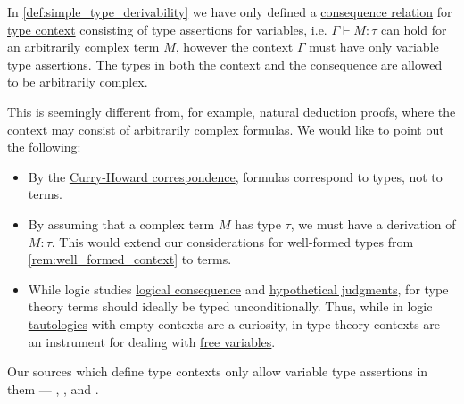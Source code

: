 \begin{remark}\label{rem:type_context_only_variables}
  In \cref{def:simple_type_derivability} we have only defined a \hyperref[def:consequence_relation]{consequence relation} for \hyperref[def:type_context]{type context} consisting of type assertions for variables, i.e. \( \Gamma \vdash M: \tau \) can hold for an arbitrarily complex term \( M \), however the context \( \Gamma \) must have only variable type assertions. The types in both the context and the consequence are allowed to be arbitrarily complex.

  This is seemingly different from, for example, natural deduction proofs, where the context may consist of arbitrarily complex formulas. We would like to point out the following:
  \begin{itemize}
    \item By the \hyperref[con:curry_howard_correspondence]{Curry-Howard correspondence}, formulas correspond to types, not to terms.

    \item By assuming that a complex term \( M \) has type \( \tau \), we must have a derivation of \( M: \tau \). This would extend our considerations for well-formed types from \cref{rem:well_formed_context} to terms.

    \item While logic studies \hyperref[def:consequence_relation]{logical consequence} and \hyperref[con:hypothetical_judgment]{hypothetical judgments}, for type theory terms should ideally be typed unconditionally. Thus, while in logic \hyperref[def:propositional_tautology]{tautologies} with empty contexts are a curiosity, in type theory contexts are an instrument for dealing with \hyperref[def:lambda_variable_freeness]{free variables}.
  \end{itemize}

  Our sources which define type contexts only allow variable type assertions in them ---
  \cite[19]{MartinLöf1984IntuitionisticTypeTheory},
  \cite[def. 2A5]{Hindley1997BasicSTT},
  \cite[def. 5.1.5]{Barendregt1992LambdaCalculiWithTypes} and
  \cite[\S 4.1]{Mimram2020ProgramEqualsProof}.
\end{remark}

